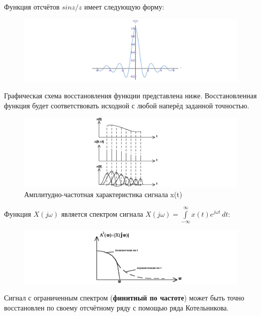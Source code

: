 	Функция отсчётов $sin z / z$ имеет следующую форму:
	\vspace{-1em}
	\begin{figure}[H]
		\hspace{-5em}
		\centering
		\includegraphics[width=1\linewidth, height=0.185\textheight]{img/03_06}
		\label{fig:03_06}
	\end{figure}
	\vspace{-1.5em}
	Графическая схема восстановления функции представлена ниже. Восстановленная 
	функция будет соответствовать исходной с любой наперёд заданной точностью.
	\vspace{-1em} 
	\begin{figure}[H]
		\centering
		\includegraphics[width=1\linewidth, height=0.175\textheight]{img/03_07}
		\small {Амплитудно-частотная характеристика сигнала x(t)}
		\label{fig:03_07}
	\end{figure}
	\vspace{-1em}
	Функция $X(j\omega)$ является спектром сигнала \(X(j\omega) = \int\limits_{-\infty}^{\infty} x(t) e^{j\omega t} \, dt\):
	\vspace{-1em}
	\begin{figure}[H]
		\centering
		\includegraphics[width=1\linewidth, height=0.15\textheight]{img/03_08}
		\label{fig:03_08}
	\end{figure}
	\vspace{-2.15em}
	Сигнал с ограниченным спектром (\textbf{финитный по частоте}) может быть точно восстановлен по своему отсчётному ряду с помощью ряда Котельникова.
	
